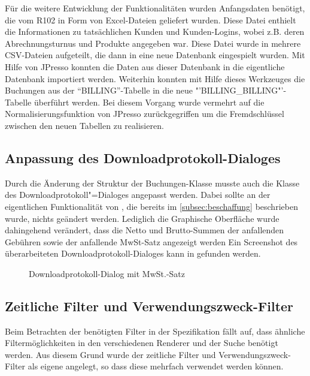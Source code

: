 Für die weitere Entwicklung der Funktionalitäten wurden Anfangsdaten benötigt, die vom R102 in Form von Excel-Dateien geliefert wurden.
Diese Datei enthielt die Informationen zu tatsächlichen Kunden und Kunden-Logins, wobei z.B. deren Abrechnungsturnus und Produkte angegeben war.
Diese Datei wurde in mehrere CSV-Dateien aufgeteilt, die dann in eine neue Datenbank eingespielt wurden.
Mit Hilfe von JPresso konnten die Daten aus dieser Datenbank in die eigentliche Datenbank importiert werden.
Weiterhin konnten mit Hilfe dieses Werkzeuges die Buchungen aus der "`BILLING"'-Tabelle in die neue "'BILLING\_BILLING"'-Tabelle überführt werden.
Bei diesem Vorgang wurde vermehrt auf die Normalisierungsfunktion von JPresso zurückgegriffen um die Fremdschlüssel zwischen den neuen Tabellen zu realisieren.

\subsection{Anpassung des Downloadprotokoll-Dialoges}
Durch die Änderung der Struktur der Buchungen-Klasse musste auch die Klasse des Downloadprotokoll"=Dialoges  angepasst werden.
Dabei sollte an der eigentlichen Funktionalität von , die bereits im \autoref{subsec:beschaffung} beschrieben wurde, nichts geändert werden.
Lediglich die Graphische Oberfläche wurde dahingehend verändert, dass die Netto und Brutto-Summen der anfallenden Gebühren sowie der anfallende MwSt-Satz angezeigt werden
Ein Screenshot des überarbeiteten Downloadprotokoll-Dialoges kann in  gefunden werden.

\begin{figure}[htb]
	\centering
	\caption{Downloadprotokoll-Dialog mit MwSt.-Satz}
	\label{fig:alkis-protocol-new}
\end{figure}

\subsection{Zeitliche Filter und Verwendungszweck-Filter}
Beim Betrachten der benötigten Filter in der Spezifikation fällt auf, dass ähnliche Filtermöglichkeiten in den verschiedenen Renderer und der Suche benötigt werden. Aus diesem Grund wurde der zeitliche Filter und Verwendungszweck-Filter als eigene  angelegt, so dass diese mehrfach verwendet werden können.

